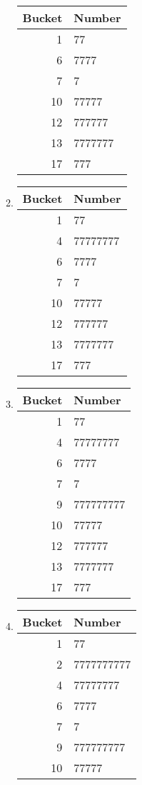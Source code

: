 \documentclass[12pt]{article}
\begin{document}
\begin{enumerate}[a]
\begin{multicols}{2}
\begin{enumerate}[1]
		\begin{tabular}{r|l}
			Bucket & Number\\\hline\hline
			1 & 77\\\hline
			6 & 7777\\\hline
			7 & 7\\\hline
			10 & 77777\\\hline
			12 & 777777\\\hline
			13 & 7777777\\\hline
			17 & 777
		\end{tabular}
		\item
		\begin{tabular}{r|l}
			Bucket & Number\\\hline\hline
			1 & 77\\\hline
			4 & 77777777\\\hline
			6 & 7777\\\hline
			7 & 7\\\hline
			10 & 77777\\\hline
			12 & 777777\\\hline
			13 & 7777777\\\hline
			17 & 777
		\end{tabular}
		\item
		\begin{tabular}{r|l}
			Bucket & Number\\\hline\hline
			1 & 77\\\hline
			4 & 77777777\\\hline
			6 & 7777\\\hline
			7 & 7\\\hline
			9 & 777777777\\\hline
			10 & 77777\\\hline
			12 & 777777\\\hline
			13 & 7777777\\\hline
			17 & 777
		\end{tabular}
		\item
		\begin{tabular}{r|l}
			Bucket & Number\\\hline\hline
			1 & 77\\\hline
			2 & 7777777777\\\hline
			4 & 77777777\\\hline
			6 & 7777\\\hline
			7 & 7\\\hline
			9 & 777777777\\\hline
			10 & 77777\\\hline

\end{tabular}
\end{enumerate}
\end{multicols}
\end{enumerate}
\end{document}
